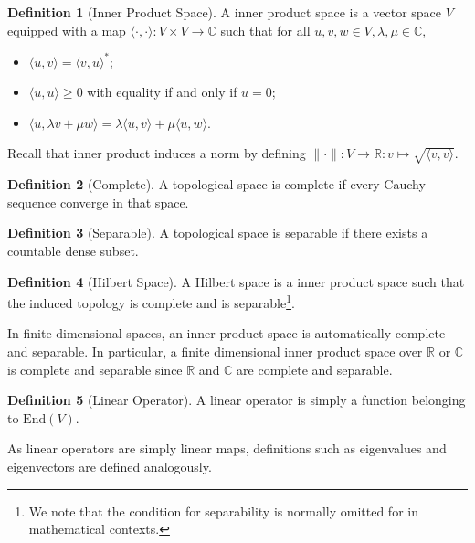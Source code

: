 \documentclass[]{article}
\theoremstyle{definition}
\theoremstyle{definition}
\newtheorem{definition}{Definition}[section]
\begin{document}
\begin{definition}[Inner Product Space]
  A inner product space is a vector space \(V\) equipped with a map 
  \(\langle \cdot, \cdot \rangle : V \times V \to \mathbb{C}\) such that 
  for all \(u, v, w \in V, \lambda, \mu \in \mathbb{C}\),
  \begin{itemize}
    \item \(\langle u, v \rangle = \langle v, u \rangle^*\);
    \item \(\langle u, u \rangle \ge 0\) with equality if and only if \(u = 0\);
    \item \(\langle u, \lambda v + \mu w \rangle = 
      \lambda \langle u, v \rangle + \mu \langle u, w\rangle\).
  \end{itemize}
\end{definition}

Recall that inner product induces a norm by defining 
\(\|\cdot\| : V \to \mathbb{R} : v \mapsto \sqrt{\langle v, v \rangle}\).

\begin{definition}[Complete]
  A topological space is complete if every Cauchy sequence converge in that space.
\end{definition}

\begin{definition}[Separable]
  A topological space is separable if there exists a countable dense subset.
\end{definition}

\begin{definition}[Hilbert Space]
  A Hilbert space is a inner product space such that the induced topology 
  is complete and is separable\footnote{We note that the condition for 
  separability is normally omitted for in mathematical contexts.}.
\end{definition}

In finite dimensional spaces, an inner product space is automatically complete 
and separable. In particular, a finite dimensional inner product space over 
\(\mathbb{R}\) or \(\mathbb{C}\) is complete and separable since 
\(\mathbb{R}\) and \(\mathbb{C}\) are complete and separable.

\begin{definition}[Linear Operator]
  A linear operator is simply a function belonging to \(\text{End}(V)\).
\end{definition}

As linear operators are simply linear maps, definitions such as eigenvalues and 
eigenvectors are defined analogously.
\end{document}
